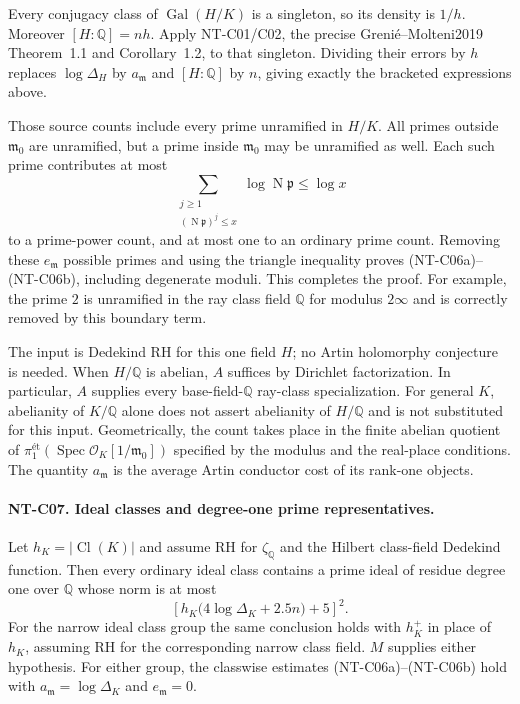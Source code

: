 Every conjugacy class of $\operatorname{Gal}(H/K)$ is a singleton,
so its density is $1/h$.  Moreover $[H:\mathbb Q]=nh$.
Apply NT-C01/C02, the precise Greni\'e--Molteni2019
Theorem~1.1 and Corollary~1.2, to that singleton.  Dividing their
errors by $h$ replaces $\log\Delta_H$ by
$a_{\mathfrak m}$ and $[H:\mathbb Q]$ by $n$, giving exactly
the bracketed expressions above.

Those source counts include every prime unramified in $H/K$.
All primes outside $\mathfrak m_0$ are unramified, but a prime
inside $\mathfrak m_0$ may be unramified as well.  Each such prime
contributes at most
\[
 \sum_{\substack{j\ge1\\(\operatorname N\mathfrak p)^j\le x}}
          \log\operatorname N\mathfrak p\le\log x
\]
to a prime-power count, and at most one to an ordinary prime
count.  Removing these $e_{\mathfrak m}$ possible primes and
using the triangle inequality proves (NT-C06a)--(NT-C06b), including
degenerate moduli.  This completes the proof.  For example, the
prime $2$ is unramified in the ray class field $\mathbb Q$ for
modulus $2\infty$ and is correctly removed by this boundary term.

The input is Dedekind RH for this one field $H$; no Artin
holomorphy conjecture is needed.  When $H/\mathbb Q$ is abelian,
$A$ suffices by Dirichlet factorization.  In particular, $A$
supplies every base-field-$\mathbb Q$ ray-class specialization.
For general $K$, abelianity of $K/\mathbb Q$ alone does not assert
abelianity of $H/\mathbb Q$ and is not substituted for this input.
Geometrically, the count takes place in the finite abelian
quotient of $\pi_1^{\text{ét}}(\operatorname{Spec}
\mathcal O_K[1/\mathfrak m_0])$ specified by the modulus and the
real-place conditions.  The quantity $a_{\mathfrak m}$ is the
average Artin conductor cost of its rank-one objects.

\paragraph{NT-C07. Ideal classes and degree-one prime representatives.}
Let $h_K=|\operatorname{Cl}(K)|$ and assume RH for
$\zeta_{\mathbb Q}$ and the Hilbert class-field Dedekind function.  Then every ordinary ideal class
contains a prime ideal of residue degree one over $\mathbb Q$
whose norm is at most
\[
 \left[h_K\bigl(4\log\Delta_K+2.5n\bigr)+5\right]^2.
\tag{NT-C07}
\]
For the narrow ideal class group the same conclusion holds with
$h_K^+$ in place of $h_K$, assuming RH for the corresponding
narrow class field.  $M$ supplies either hypothesis.
For either group, the classwise estimates (NT-C06a)--(NT-C06b)
hold with $a_{\mathfrak m}=\log\Delta_K$ and
$e_{\mathfrak m}=0$.

